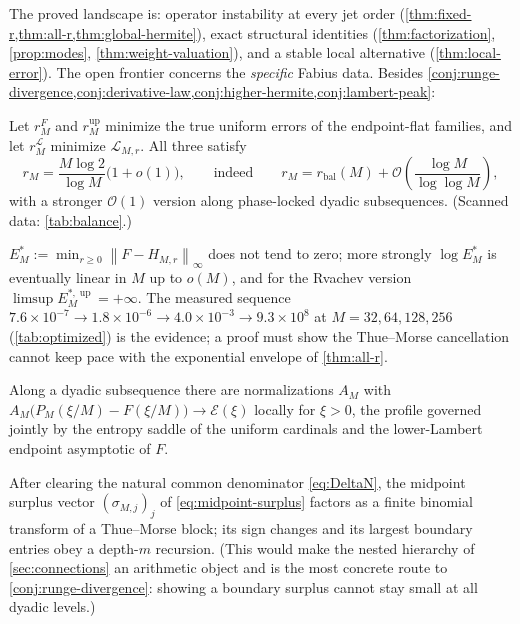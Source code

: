 \documentclass[11pt,oneside]{article}
\numberwithin{equation}{section}
\theoremstyle{definition}
\theoremstyle{remark}
\newcommand{\Up}{\operatorname{up}}
\newcommand{\bigO}{\mathcal O}
\newcommand{\smallo}{o}
\newcommand{\norm}[1]{\left\lVert #1\right\rVert}
\newcommand{\Leb}{\mathscr L}
\begin{document}
The proved landscape is: operator instability at every jet order
(\cref{thm:fixed-r,thm:all-r,thm:global-hermite}), exact structural
identities (\cref{thm:factorization}, \cref{prop:modes},
\cref{thm:weight-valuation}), and a stable local alternative
(\cref{thm:local-error}).  The open frontier concerns the
\emph{specific} Fabius data.  Besides
\cref{conj:runge-divergence,conj:derivative-law,conj:higher-hermite,conj:lambert-peak}:

\begin{conjecture}
\label{conj:optimal-r}
Let $r^{F}_M$ and $r^{\Up}_M$ minimize the true uniform errors of the
endpoint-flat families, and let $r^{\Leb}_M$ minimize
$\Leb_{M,r}$.  All three satisfy
\begin{equation}
 r_M=\frac{M\log2}{\log M}\bigl(1+\smallo(1)\bigr),
 \qquad\text{indeed}\qquad
 r_M=r_{\mathrm{bal}}(M)+\bigO\!\left(\frac{\log M}{\log\log M}\right),
 \label{eq:optimal-r-conj}
\end{equation}
with a stronger $\bigO(1)$ version along phase-locked dyadic
subsequences.  (Scanned data: \cref{tab:balance}.)
\end{conjecture}

\begin{conjecture}
\label{conj:optimized-divergence}
$E^{*}_M:=\min_{r\ge0}\norm{F-H_{M,r}}_\infty$ does not tend to zero;
more strongly $\log E^{*}_M$ is eventually linear in $M$ up to
$\smallo(M)$, and for the Rvachev version
$\limsup E^{*,\Up}_M=+\infty$.  The measured sequence
$7.6\times10^{-7}\to1.8\times10^{-6}\to4.0\times10^{-3}
\to9.3\times10^{8}$ at $M=32,64,128,256$
(\cref{tab:optimized}) is the evidence; a proof must show the
Thue--Morse cancellation cannot keep pace with the exponential
envelope of \cref{thm:all-r}.
\end{conjecture}

\begin{conjecture}
\label{conj:boundary-profile}
Along a dyadic subsequence there are normalizations $A_M$ with
$A_M\bigl(P_M(\xi/M)-F(\xi/M)\bigr)\to\mathcal E(\xi)$ locally for
$\xi>0$, the profile governed jointly by the entropy saddle of the
uniform cardinals and the lower-Lambert endpoint asymptotic of $F$.
\end{conjecture}

\begin{conjecture}
\label{conj:surplus}
After clearing the natural common denominator
\eqref{eq:DeltaN}, the midpoint surplus vector
$(\sigma_{M,j})_j$ of \eqref{eq:midpoint-surplus} factors as a finite
binomial transform of a Thue--Morse block; its sign changes and its
largest boundary entries obey a depth-$m$ recursion.  (This would
make the nested hierarchy of \cref{sec:connections} an arithmetic
object and is the most concrete route to
\cref{conj:runge-divergence}: showing a boundary surplus cannot stay
small at all dyadic levels.)
\end{conjecture}
\end{document}
